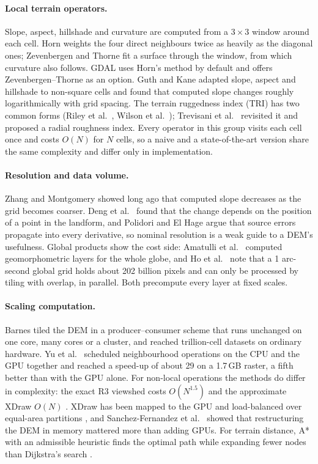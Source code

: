 \documentclass[11pt,a4paper]{article}
\begin{document}
\paragraph{Local terrain operators.} Slope, aspect, hillshade and curvature are computed from a $3\times3$ window
around each cell. Horn \cite{horn} weights the four direct neighbours twice as heavily as the diagonal ones;
Zevenbergen and Thorne \cite{zt} fit a surface through the window, from which curvature also follows. GDAL uses
Horn's method by default and offers Zevenbergen--Thorne as an option. Guth and Kane \cite{guth} adapted slope, aspect
and hillshade to non-square cells and found that computed slope changes roughly logarithmically with grid spacing.
The terrain ruggedness index (TRI) has two common forms (Riley et al.\ \cite{riley}, Wilson et al.\ \cite{wilson});
Trevisani et al.\ \cite{trevisani} revisited it and proposed a radial roughness index. Every operator in this group
visits each cell once and costs $O(N)$ for $N$ cells, so a naive and a state-of-the-art version share the same
complexity and differ only in implementation.

\paragraph{Resolution and data volume.} Zhang and Montgomery \cite{zhang} showed long ago that computed slope
decreases as the grid becomes coarser. Deng et al.\ \cite{deng} found that the change depends on the position of a
point in the landform, and Polidori and El Hage \cite{polidori} argue that source errors propagate into every
derivative, so nominal resolution is a weak guide to a DEM's usefulness. Global products show the cost side:
Amatulli et al.\ \cite{amatulli} computed geomorphometric layers for the whole globe, and Ho et al.\ \cite{ho} note
that a 1 arc-second global grid holds about 202 billion pixels and can only be processed by tiling with overlap, in
parallel. Both precompute every layer at fixed scales.

\paragraph{Scaling computation.} Barnes \cite{barnes} tiled the DEM in a producer--consumer scheme that runs
unchanged on one core, many cores or a cluster, and reached trillion-cell datasets on ordinary hardware. Yu et al.\
\cite{yu} scheduled neighbourhood operations on the CPU and the GPU together and reached a speed-up of about 29 on a
1.7\,GB raster, a fifth better than with the GPU alone. For non-local operations the methods do differ in
complexity: the exact R3 viewshed costs $O(N^{1.5})$ and the approximate XDraw $O(N)$
\cite{sanchez}. XDraw has been mapped to the GPU \cite{cauchi} and load-balanced over equal-area partitions
\cite{dou}, and Sanchez-Fernandez et al.\ \cite{sanchez} showed that restructuring the DEM in memory mattered more
than adding GPUs. For terrain distance, A* with an admissible heuristic finds the optimal path while expanding fewer
nodes than Dijkstra's search \cite{hart}.
\end{document}

